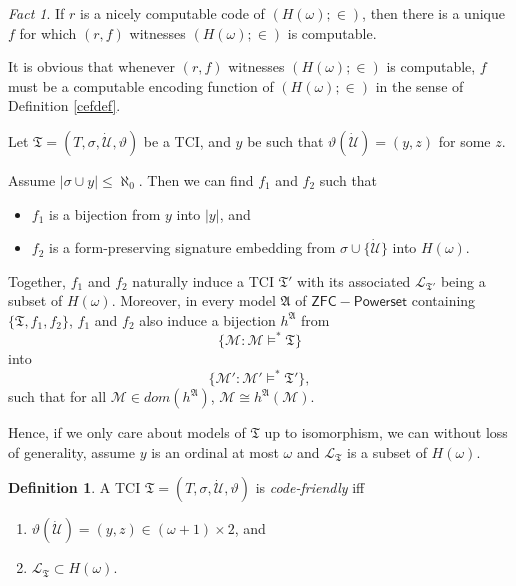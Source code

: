 \documentclass[12pt, twoside]{memoir}
\numberwithin{equation}{section}
\theoremstyle{definition}
\newtheorem{defi}[thm]{Definition}
\theoremstyle{remark}
\newtheorem{fact}[thm]{Fact}
\theoremstyle{definition}
\theoremstyle{definition}
\theoremstyle{definition}
\theoremstyle{remark}
\begin{document}
\begin{fact}\label{uniquecode}
If $r$ is a nicely computable code of $(H(\omega); \in)$, then there is a unique $f$ for which $(r, f)$ witnesses $(H(\omega); \in)$ is computable.
\end{fact}

It is obvious that whenever $(r, f)$ witnesses $(H(\omega); \in)$ is computable, $f$ must be a computable encoding function of $(H(\omega); \in)$ in the sense of Definition \ref{cefdef}.

Let $\mathfrak{T} = (T, \sigma, \dot{\mathcal{U}}, \vartheta)$ be a TCI, and $y$ be such that $\vartheta(\dot{\mathcal{U}}) = (y, z)$ for some $z$.

Assume $|\sigma \cup y| \leq \aleph_0$. Then we can find $f_1$ and $f_2$ such that
\begin{itemize}
    \item $f_1$ is a bijection from $y$ into $|y|$, and
    \item $f_2$ is a form-preserving signature embedding from $\sigma \cup \{\dot{\mathcal{U}}\}$ into $H(\omega)$.
\end{itemize}
Together, $f_1$ and $f_2$ naturally induce a TCI $\mathfrak{T}'$ with its associated $\mathcal{L}_{\mathfrak{T}'}$ being a subset of $H(\omega)$. Moreover, in every model $\mathfrak{A}$ of $\mathsf{ZFC - Powerset}$ containing $\{\mathfrak{T}, f_1, f_2\}$, $f_1$ and $f_2$ also induce a bijection $h^{\mathfrak{A}}$ from $$\{\mathcal{M} : \mathcal{M} \models^* \mathfrak{T}\}$$ into $$\{\mathcal{M}' : \mathcal{M}' \models^* \mathfrak{T}'\},$$ such that for all $\mathcal{M} \in dom(h^{\mathfrak{A}})$, $\mathcal{M} \cong h^{\mathfrak{A}}(\mathcal{M})$. 

Hence, if we only care about models of $\mathfrak{T}$ up to isomorphism, we can without loss of generality, assume $y$ is an ordinal at most $\omega$ and $\mathcal{L}_{\mathfrak{T}}$ is a subset of $H(\omega)$.

\begin{defi}
A TCI $\mathfrak{T} = (T, \sigma, \dot{\mathcal{U}}, \vartheta)$ is \emph{code-friendly} iff 
\begin{enumerate}[label=(\alph*)]
    \item $\vartheta(\dot{\mathcal{U}}) = (y, z) \in (\omega + 1) \times 2$, and 
    \item $\mathcal{L}_{\mathfrak{T}} \subset H(\omega)$.
\end{enumerate}
\end{defi}
\end{document}
